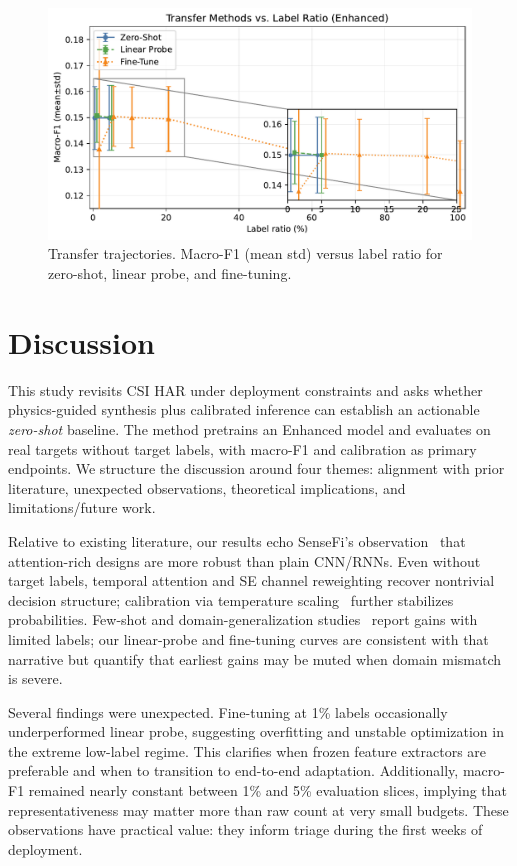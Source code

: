 \documentclass[journal]{IEEEtran}
\begin{document}
\begin{figure}[t]
\centering
\includegraphics[width=\columnwidth]{plots/transfer_compare.pdf}
\caption{Transfer trajectories. Macro-F1 (mean\,\textpm\,std) versus label ratio for zero-shot, linear probe, and fine-tuning.}
\label{fig:transfer_compare}
\end{figure}

\section{Discussion}
This study revisits CSI HAR under deployment constraints and asks whether physics-guided synthesis plus calibrated inference can establish an actionable \emph{zero-shot} baseline. The method pretrains an Enhanced model and evaluates on real targets without target labels, with macro-F1 and calibration as primary endpoints. We structure the discussion around four themes: alignment with prior literature, unexpected observations, theoretical implications, and limitations/future work.

Relative to existing literature, our results echo SenseFi’s observation~\cite{yang2023sensefi} that attention-rich designs are more robust than plain CNN/RNNs. Even without target labels, temporal attention and SE channel reweighting recover nontrivial decision structure; calibration via temperature scaling~\cite{calibration_guo2017} further stabilizes probabilities. Few-shot and domain-generalization studies~\cite{fewsense2022,airfi2022} report gains with limited labels; our linear-probe and fine-tuning curves are consistent with that narrative but quantify that earliest gains may be muted when domain mismatch is severe.

Several findings were unexpected. Fine-tuning at 1\% labels occasionally underperformed linear probe, suggesting overfitting and unstable optimization in the extreme low-label regime. This clarifies when frozen feature extractors are preferable and when to transition to end-to-end adaptation. Additionally, macro-F1 remained nearly constant between 1\% and 5\% evaluation slices, implying that representativeness may matter more than raw count at very small budgets. These observations have practical value: they inform triage during the first weeks of deployment.
\end{document}
